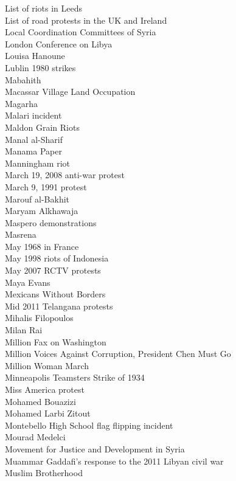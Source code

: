 List of riots in Leeds\\
List of road protests in the UK and Ireland\\
Local Coordination Committees of Syria\\
London Conference on Libya\\
Louisa Hanoune\\
Lublin 1980 strikes\\
Mabahith\\
Macassar Village Land Occupation\\
Magarha\\
Malari incident\\
Maldon Grain Riots\\
Manal al-Sharif\\
Manama Paper\\
Manningham riot\\
March 19, 2008 anti-war protest\\
March 9, 1991 protest\\
Marouf al-Bakhit\\
Maryam Alkhawaja\\
Maspero demonstrations\\
Masrena\\
May 1968 in France\\
May 1998 riots of Indonesia\\
May 2007 RCTV protests\\
Maya Evans\\
Mexicans Without Borders\\
Mid 2011 Telangana protests\\
Mihalis Filopoulos\\
Milan Rai\\
Million Fax on Washington\\
Million Voices Against Corruption, President Chen Must Go\\
Million Woman March\\
Minneapolis Teamsters Strike of 1934\\
Miss America protest\\
Mohamed Bouazizi\\
Mohamed Larbi Zitout\\
Montebello High School flag flipping incident\\
Mourad Medelci\\
Movement for Justice and Development in Syria\\
Muammar Gaddafi's response to the 2011 Libyan civil war\\
Muslim Brotherhood\\
